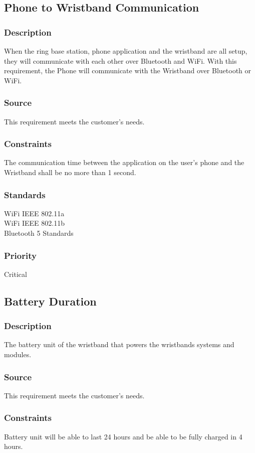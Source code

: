 \subsection{Phone to Wristband Communication}
\subsubsection{Description}
When the ring base station, phone application and the wristband are all setup, they will communicate with each other over Bluetooth and WiFi. With this requirement, the Phone will communicate with the Wristband over Bluetooth or WiFi.
\subsubsection{Source}
This requirement meets the customer's needs.
\subsubsection{Constraints}
The communication time between the application on the user's phone and the Wristband shall be no more than 1 second.
\subsubsection{Standards}
WiFi IEEE 802.11a
\\WiFi IEEE 802.11b
\\Bluetooth 5 Standards
\subsubsection{Priority}
Critical 

\subsection{Battery Duration}
\subsubsection{Description}
The battery unit of the wristband that powers the wristbands systems and modules.
\subsubsection{Source}
This requirement meets the customer's needs.
\subsubsection{Constraints}
Battery unit will be able to last 24 hours and be able to be fully charged in 4 hours. 

